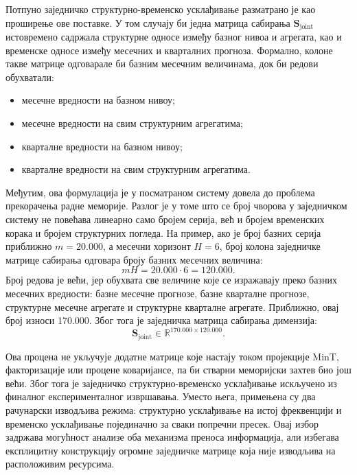 \documentclass[12pt,oneside]{memoir}
\begin{document}
Потпуно заједничко структурно-временско усклађивање разматрано је као проширење ове поставке. У том случају би једна матрица сабирања $\mathbf{S}_{\mathrm{joint}}$ истовремено садржала структурне односе између базног нивоа и агрегата, као и временске односе између месечних и кварталних прогноза. Формално, колоне такве матрице одговарале би базним месечним величинама, док би редови обухватали:
\begin{itemize}
    \item месечне вредности на базном нивоу;
    \item месечне вредности на свим структурним агрегатима;
    \item кварталне вредности на базном нивоу;
    \item кварталне вредности на свим структурним агрегатима.
\end{itemize}

Међутим, ова формулација је у посматраном систему довела до проблема прекорачења радне меморије. Разлог је у томе што се број чворова у заједничком систему не повећава линеарно само бројем серија, већ и бројем временских корака и бројем структурних погледа. 
На пример, ако је број базних серија приближно $m=20.000$, а месечни хоризонт $H=6$, број колона заједничке матрице сабирања одговара броју базних месечних величина:
\begin{equation}
    mH = 20.000 \cdot 6 = 120.000.
\end{equation}
Број редова је већи, јер обухвата све величине које се изражавају преко базних месечних вредности: базне месечне прогнозе, базне кварталне прогнозе, структурне месечне агрегате и структурне кварталне агрегате. Приближно, овај број износи 170.000.
Због тога је заједничка матрица сабирања димензија:
\begin{equation}
    \mathbf{S}_{\mathrm{joint}}
    \in
    \mathbb{R}^{170.000 \times 120.000}.
\end{equation}

Ова процена не укључује додатне матрице које настају током пројекције MinT, факторизације или процене коваријансе, па би стварни меморијски захтев био још већи. Због тога је заједничко структурно-временско усклађивање искључено из финалног експерименталног извршавања. Уместо њега, примењена су два рачунарски изводљива режима: структурно усклађивање на истој фреквенцији и временско усклађивање појединачно за сваки попречни пресек. Овај избор задржава могућност анализе оба механизма преноса информација, али избегава експлицитну конструкцију огромне заједничке матрице која није изводљива на расположивим ресурсима.
\end{document}
